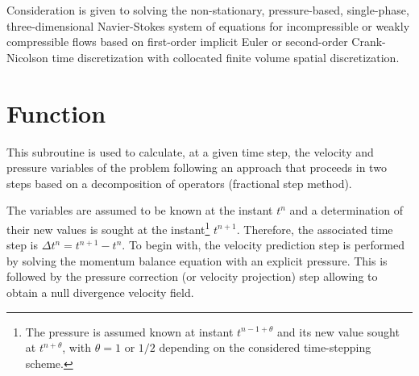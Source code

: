 
%
%
%
%


\label{ap:navstv}

\vspace{1cm}
Consideration is given to solving the non-stationary, pressure-based,
single-phase, three-dimensional Navier-Stokes system of equations for
incompressible or weakly compressible flows based on first-order implicit
Euler or second-order Crank-Nicolson time discretization with collocated
finite volume spatial discretization.


\section*{Function}

This subroutine is used to calculate, at a given time step, the velocity
 and pressure variables of the problem following an approach that proceeds
 in two steps based on a decomposition of operators (fractional step method).

The variables are assumed to be known at the instant ${t^n}$ and a
determination of their new values is sought at the
instant\footnote{The pressure is assumed known at instant $t^{n-1+\theta}$
and its new value sought at $t^{n+\theta}$, with $\theta=1$ or $1/2$
depending on the considered time-stepping scheme.} ${t^{n+1}}$.
Therefore, the associated time step is ${\Delta {t^n} ={t^{n+1}- {t^n}}}$.
To begin with, the velocity prediction step is performed by solving the
momentum balance equation with an explicit pressure. This is followed by
the pressure correction (or velocity projection) step allowing to obtain
a null divergence velocity field.

